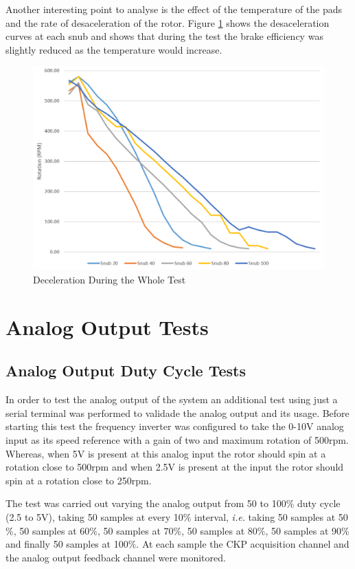 		Another interesting point to analyse is the effect of the temperature of the pads and the rate of desaceleration of the rotor. Figure \ref{fig:snubs-rotation} shows the desaceleration curves at each snub and shows that during the test the brake efficiency was slightly reduced as the temperature would increase.

		\begin{figure}[htbp]
				\centering
				\includegraphics[width=.8\textwidth]{figuras/fig-snubs-rotation}
				\caption{Deceleration During the Whole Test}
				\label{fig:snubs-rotation}
		\end{figure}

\section{Analog Output Tests}\label{sec:analog-output-test}
	
	\subsection{Analog Output Duty Cycle Tests}\label{sec:duty-cycle-test}

		In order to test the analog output of the system an additional test using just a serial terminal was performed to validade the analog output and its usage. Before starting this test the frequency inverter was configured to take the 0-10V analog input as its speed reference with a gain of two and maximum rotation of 500rpm. Whereas, when 5V is present at this analog input the rotor should spin at a rotation close to 500rpm and when 2.5V is present at the input the rotor should spin at a rotation close to 250rpm.
		\par
		The test was carried out varying the analog output from 50 to 100$\%$ duty cycle (2.5 to 5V), taking 50 samples at every 10$\%$ interval, \textit{i.e.} taking 50 samples at 50$\%$, 50 samples at 60$\%$, 50 samples at 70$\%$, 50 samples at 80$\%$, 50 samples at 90$\%$ and finally 50 samples at 100$\%$. At each sample the CKP acquisition channel and the analog output feedback channel were monitored.
	

